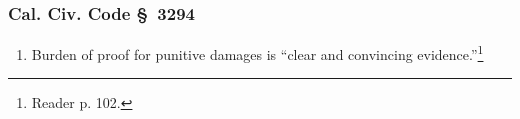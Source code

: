 \subsubsection{Cal. Civ. Code \S\ 3294}

\begin{enumerate}
    \item Burden of proof for punitive damages is ``clear and convincing
    evidence.''\footnote{Reader p. 102.}
\end{enumerate}
